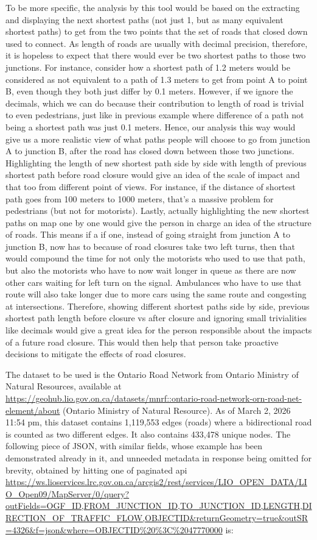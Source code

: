 \documentclass[fontsize=11pt]{article}
\begin{document}
To be more specific, the analysis by this tool would be based on the extracting and displaying the next shortest paths (not just 1, but as many equivalent shortest paths) to get from the two points that the set of roads that closed down used to connect. As length of roads are usually with decimal precision, therefore, it is hopeless to expect that there would ever be two shortest paths to those two junctions. For instance, consider how a shortest path of 1.2 meters would be considered as not equivalent to a path of 1.3 meters to get from point A to point B, even though they both just differ by 0.1 meters. However, if we ignore the decimals, which we can do because their contribution to length of road is trivial to even pedestrians, just like in previous example where difference of a path not being a shortest path was just 0.1 meters. Hence, our analysis this way would give us a more realistic view of what paths people will choose to go from junction A to junction B, after the road has closed down between those two junctions. Highlighting the length of new shortest path side by side with length of previous shortest path before road closure would give an idea of the scale of impact and that too from different point of views. For instance, if the distance of shortest path goes from 100 meters to 1000 meters, that's a massive problem for pedestrians (but not for motorists). Lastly, actually highlighting the new shortest paths on map one by one would give the person in charge an idea of the structure of roads. This means if a if one, instead of going straight from junction A to junction B, now has to because of road closures take two left turns, then that would compound the time for not only the motorists who used to use that path, but also the motorists who have to now wait longer in queue as there are now other cars waiting for left turn on the signal. Ambulances who have to use that route will also take longer due to more cars using the same route and congesting at intersections. Therefore, showing different shortest paths side by side, previous shortest path length before closure vs after closure and ignoring small trivialities like decimals would give a great idea for the person responsible about the impacts of a future road closure. This would then help that person take proactive decisions to mitigate the effects of road closures.

The dataset to be used is the Ontario Road Network from Ontario Ministry of Natural Resources, available at \url{https://geohub.lio.gov.on.ca/datasets/mnrf::ontario-road-network-orn-road-net-element/about} (Ontario Ministry of Natural Resource). As of March 2, 2026 11:54 pm, this dataset contains 1,119,553 edges (roads) where a bidirectional road is counted as two different edges. It also contains 433,478 unique nodes. 
The following piece of JSON, with similar fields, whose example has been demonstrated already in it, and unneeded metadata in response being omitted for brevity, obtained by hitting one of paginated api \url{https://ws.lioservices.lrc.gov.on.ca/arcgis2/rest/services/LIO_OPEN_DATA/LIO_Open09/MapServer/0/query?outFields=OGF_ID,FROM_JUNCTION_ID,TO_JUNCTION_ID,LENGTH,DIRECTION_OF_TRAFFIC_FLOW,OBJECTID&returnGeometry=true&outSR=4326&f=json&where=OBJECTID%20%3C%2047770000} is:
\end{document}
